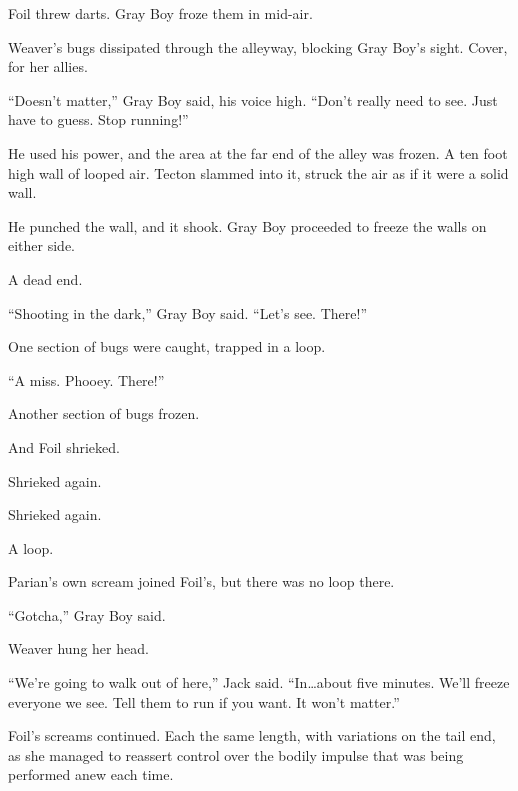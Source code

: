 Foil threw darts.  Gray Boy froze them in mid-air.



Weaver's bugs dissipated through the alleyway, blocking Gray Boy's sight.  Cover, for her allies.



``Doesn't matter,'' Gray Boy said, his voice high.  ``Don't really need to see.  Just have to guess.  Stop running!''



He used his power, and the area at the far end of the alley was frozen.  A ten foot high wall of looped air.  Tecton slammed into it, struck the air as if it were a solid wall.



He punched the wall, and it shook.  Gray Boy proceeded to freeze the walls on either side.



A dead end.



``Shooting in the dark,'' Gray Boy said.  ``Let's see.  There!''



One section of bugs were caught, trapped in a loop.



``A miss.  Phooey.  There!''



Another section of bugs frozen.



And Foil shrieked.



Shrieked again.



Shrieked again.



A loop.



Parian's own scream joined Foil's, but there was no loop there.



``Gotcha,'' Gray Boy said.



Weaver hung her head.



``We're going to walk out of here,'' Jack said.  ``In\ldots about five minutes.  We'll freeze everyone we see.  Tell them to run if you want.  It won't matter.''



Foil's screams continued.  Each the same length, with variations on the tail end, as she managed to reassert control over the bodily impulse that was being performed anew each time.



